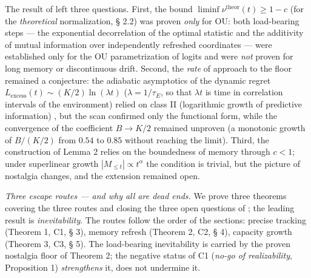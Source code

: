 \documentclass[12pt]{iopart}
\begin{document}
The result of \cite{Andriishin2026b} left three questions. First, the bound \(\liminf \nu^{\text{theor}}(t) \ge 1 - c\) (for the \emph{theoretical} normalization, § 2.2) was proven \emph{only} for OU: both load-bearing steps --- the exponential decorrelation of the optimal statistic and the additivity of mutual information over independently refreshed coordinates --- were established only for the OU parametrization of logits and were \emph{not} proven for long memory or discontinuous drift. Second, the \emph{rate} of approach to the floor remained a conjecture: the adiabatic asymptotics of the dynamic regret \(L_{\text{excess}}(t) \sim (K/2)\ln(\lambda t)\) (\(\lambda = 1/\tau_E\), so that \(\lambda t\) is time in correlation intervals of the environment) relied on class II (logarithmic growth of predictive information) \cite{BialekNemenmanTishby2001}, but the scan confirmed only the functional form, while the convergence of the coefficient \(B \to K/2\) remained unproven (a monotonic growth of \(B/(K/2)\) from \(0.54\) to \(0.85\) without reaching the limit). Third, the construction of Lemma 2 relies on the boundedness of memory through \(c < 1\); under superlinear growth \(|M_{\le t}| \propto t^\alpha\) the condition is trivial, but the picture of nostalgia changes, and the extension remained open.



\emph{Three escape routes --- and why all are dead ends.} We prove three theorems covering the three routes and closing the three open questions of \cite{Andriishin2026b}; the leading result is \emph{inevitability}. The routes follow the order of the sections: precise tracking (Theorem 1, C1, § 3), memory refresh (Theorem 2, C2, § 4), capacity growth (Theorem 3, C3, § 5). The load-bearing inevitability is carried by the proven nostalgia floor of Theorem 2; the negative status of C1 (\emph{no-go of realizability}, Proposition 1) \emph{strengthens} it, does not undermine it.
\end{document}
